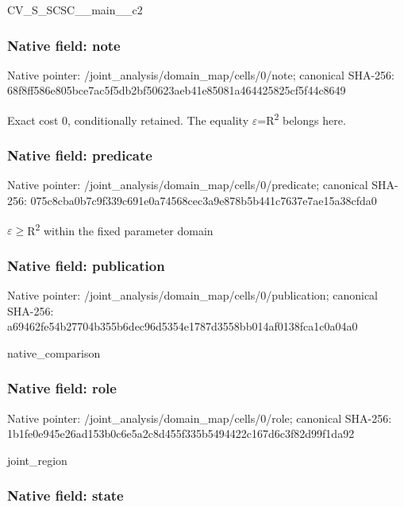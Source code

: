 \documentclass[10pt,a4paper]{article}
\begin{document}
CV\_S\_SCSC\_\_main\_\_c2


\subsubsection{Native field: note}


Native pointer: /joint\_analysis/domain\_map/cells/0/note; canonical SHA-256: 68f8ff586e805bce7ac5f5db\allowbreak{}2bf50623aeb41e85081a4644\allowbreak{}25825cf5f44c8649


Exact cost 0, conditionally retained. The equality \ensuremath{\varepsilon}=R\textsuperscript{2} belongs here.


\subsubsection{Native field: predicate}


Native pointer: /joint\_analysis/domain\_m\allowbreak{}ap/cells/0/predicate; canonical SHA-256: 075c8cba0b7c9f339c691e0a\allowbreak{}74568cec3a9e878b5b441c76\allowbreak{}37e7ae15a38cfda0


\ensuremath{\varepsilon}\ensuremath{\ge}R\textsuperscript{2} within the fixed parameter domain


\subsubsection{Native field: publication}


Native pointer: /joint\_analysis/domain\_m\allowbreak{}ap/cells/0/publication; canonical SHA-256: a69462fe54b27704b355b6de\allowbreak{}c96d5354e1787d3558bb014a\allowbreak{}f0138fca1c0a04a0


native\_comparison


\subsubsection{Native field: role}


Native pointer: /joint\_analysis/domain\_map/cells/0/role; canonical SHA-256: 1b1fe0e945e26ad153b0c6e5\allowbreak{}a2c8d455f335b5494422c167\allowbreak{}d6c3f82d99f1da92


joint\_region


\subsubsection{Native field: state}
\end{document}
